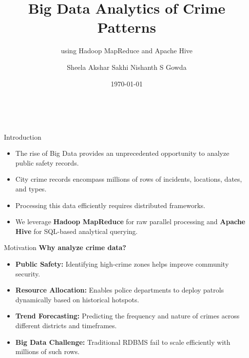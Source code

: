 \documentclass[aspectratio=169]{beamer}
\title[Big Data: Crime Patterns]{Big Data Analytics of Crime Patterns}
\subtitle{using Hadoop MapReduce and Apache Hive}
\author[Team Members]{Sheela Akshar Sakhi \quad Nishanth S Gowda}
\institute[Amrita]{Amrita Vishwa Vidyapeetham}
\date{\today}
\begin{document}
\begin{frame}
    
    \vspace{1cm}
    \begin{center}
        \textcolor{NavyBlue}{\inserttitle}\par
        \vspace{0.5cm}
        \insertsubtitle\par
        \vspace{1cm}
        \textit{\color{DarkGray}\insertauthor} \\
        \vspace{0.5cm}
        \color{DarkGray}\insertinstitute
    \end{center}
\end{frame}


\begin{frame}{Introduction}
    \begin{itemize}
        \item The rise of Big Data provides an unprecedented opportunity to analyze public safety records.
        \item City crime records encompass millions of rows of incidents, locations, dates, and types.
        \item Processing this data efficiently requires distributed frameworks.
        \item We leverage \textbf{\textcolor{NavyBlue}{Hadoop MapReduce}} for raw parallel processing and \textbf{\textcolor{AmritaMaroon}{Apache Hive}} for SQL-based analytical querying.
    \end{itemize}
\end{frame}

\begin{frame}{Motivation}
    \textbf{Why analyze crime data?}
    \vspace{0.3cm}
    \begin{itemize}
        \item \textbf{Public Safety:} Identifying high-crime zones helps improve community security.
        \item \textbf{Resource Allocation:} Enables police departments to deploy patrols dynamically based on historical hotspots.
        \item \textbf{Trend Forecasting:} Predicting the frequency and nature of crimes across different districts and timeframes.
        \item \textbf{Big Data Challenge:} Traditional RDBMS fail to scale efficiently with millions of such rows.
    \end{itemize}
\end{frame}
\end{document}
